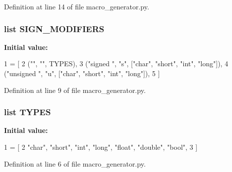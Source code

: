 Definition at line 14 of file macro\+\_\+generator.\+py.

\subsubsection[{S\+I\+G\+N\+\_\+\+M\+O\+D\+I\+F\+I\+E\+RS}]{\setlength{\rightskip}{0pt plus 5cm}list S\+I\+G\+N\+\_\+\+M\+O\+D\+I\+F\+I\+E\+RS}\label{namespacemacro__generator_ad224c1466815f530b3fdb5d9b29502b9}
{\bfseries Initial value\+:}
\begin{DoxyCode}
1 = [
2     (\textcolor{stringliteral}{""}, \textcolor{stringliteral}{""}, TYPES),
3     (\textcolor{stringliteral}{"signed "}, \textcolor{stringliteral}{"s"}, [\textcolor{stringliteral}{"char"}, \textcolor{stringliteral}{"short"}, \textcolor{stringliteral}{"int"}, \textcolor{stringliteral}{"long"}]),
4     (\textcolor{stringliteral}{"unsigned "}, \textcolor{stringliteral}{"u", ["}char", "short", "int", "long"]),
5 ]
\end{DoxyCode}


Definition at line 9 of file macro\+\_\+generator.\+py.

\subsubsection[{T\+Y\+P\+ES}]{\setlength{\rightskip}{0pt plus 5cm}list T\+Y\+P\+ES}\label{namespacemacro__generator_aa7944d1e3e38265ec58e18b685c61868}
{\bfseries Initial value\+:}
\begin{DoxyCode}
1 = [
2     \textcolor{stringliteral}{"char"}, \textcolor{stringliteral}{"short"}, \textcolor{stringliteral}{"int"}, \textcolor{stringliteral}{"long"}, \textcolor{stringliteral}{"float"}, \textcolor{stringliteral}{"double"}, \textcolor{stringliteral}{"bool"},
3 ]
\end{DoxyCode}


Definition at line 6 of file macro\+\_\+generator.\+py.

